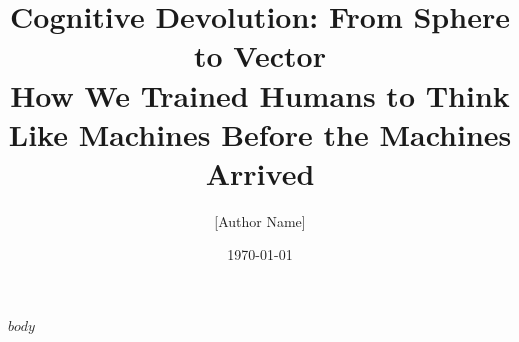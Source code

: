 \documentclass[12pt,a4paper]{article}
\title{Cognitive Devolution: From Sphere to Vector\\
\large{How We Trained Humans to Think Like Machines Before the Machines Arrived}}
\author{[Author Name]}
\date{\today}
\begin{document}
$body$
\end{document}
